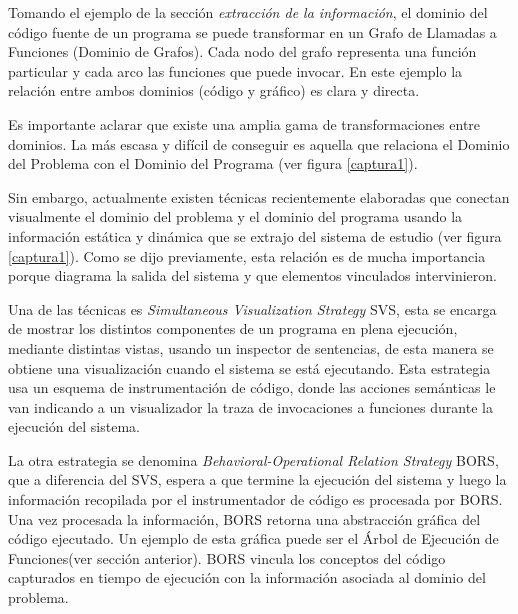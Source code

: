 \documentclass[a4paper,12pt]{report}
\begin{document}

Tomando el ejemplo de la sección \textit{extracción de la información}, el dominio del código fuente de un programa  se puede transformar en un Grafo de Llamadas a Funciones (Dominio de Grafos). Cada nodo del grafo representa una función particular y cada arco las funciones que puede invocar. En este ejemplo la relación entre ambos dominios (código y gráfico) es clara y directa. 

Es importante aclarar que existe una amplia gama de transformaciones entre dominios. La más escasa y difícil de conseguir es aquella que relaciona el Dominio del Problema con el Dominio del Programa (ver figura \ref{captura1}).

Sin embargo, actualmente existen técnicas recientemente elaboradas que conectan visualmente el dominio del problema y el dominio del programa usando la información estática y dinámica que se extrajo del sistema de estudio (ver figura \ref{captura1}). Como se dijo previamente, esta relación es de mucha importancia porque diagrama la salida del sistema y que elementos vinculados intervinieron.

Una de las técnicas es \textit{Simultaneous Visualization Strategy} SVS, esta se encarga de mostrar los distintos componentes de un programa en plena ejecución, mediante distintas vistas, usando un inspector de sentencias, de esta manera se obtiene una visualización cuando el sistema se está ejecutando. Esta estrategia usa un esquema de instrumentación de código, donde las acciones semánticas le van indicando a un visualizador la traza de invocaciones a funciones durante la ejecución del sistema\cite{BRM10,MPMR07}.

La otra estrategia se denomina \textit{Behavioral-Operational Relation Strategy} BORS, que a diferencia del SVS, espera a que termine la ejecución del sistema y luego la información recopilada por el instrumentador de código es procesada por BORS. Una vez procesada la información, BORS retorna una abstracción gráfica del código ejecutado. Un ejemplo de esta gráfica puede ser el Árbol de Ejecución de Funciones(ver sección anterior). BORS vincula los conceptos del código capturados en tiempo de ejecución con la información asociada al dominio del problema\cite{BRM10,MPMR07}.
\end{document}
